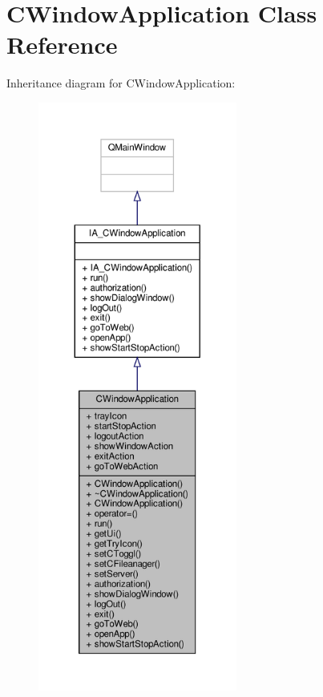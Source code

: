 \hypertarget{classCWindowApplication}{}\section{C\+Window\+Application Class Reference}
\label{classCWindowApplication}


Inheritance diagram for C\+Window\+Application\+:
\nopagebreak
\begin{figure}[H]
\begin{center}
\leavevmode
\includegraphics[height=550pt]{classCWindowApplication__inherit__graph}
\end{center}
\end{figure}


